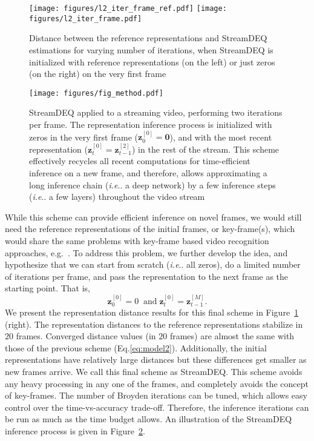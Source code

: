 \documentclass[runningheads]{llncs}
\makeatletter
\DeclareRobustCommand\onedot{\futurelet\@let@token\@onedot}
\def\@onedot{\ifx\@let@token.\else.\null\fi\xspace}
\def\ie{\emph{i.e}\onedot} \def\Ie{\emph{I.e}\onedot}
\makeatother
\begin{document}
\begin{figure}[t]
    \centering
    \texttt{[image: figures/l2\_iter\_frame\_ref.pdf]}
    \hfill
    \texttt{[image: figures/l2\_iter\_frame.pdf]} 
\caption{Distance between the reference representations and StreamDEQ estimations for varying number of iterations, when StreamDEQ is initialized with reference representations (on the left) or just zeros (on the right) on the very first frame}
\label{fig:l2_iter_frame}
\end{figure}


\begin{figure}[t]
\centering
\texttt{[image: figures/fig\_method.pdf]}
\caption{StreamDEQ applied to a streaming video, performing two iterations per frame. The representation inference process is initialized with zeros in the very first frame ($\mathbf{z}_0^{[0]}=\mathbf{0}$), and with the most recent representation ($\mathbf{z}_t^{[0]}=\mathbf{z}_{t-1}^{[2]}$) in the rest of the stream. This scheme effectively recycles all recent computations for time-efficient inference on a new frame, and therefore, allows approximating a long inference chain (\ie a deep network) by a few inference steps (\ie a few layers) throughout the video stream}
\label{fig:model_picture}
\end{figure}


While this scheme can provide efficient inference on novel frames, we would still need the reference representations of the initial frames, or key-frame(s), which would share the same problems with key-frame based video recognition approaches, e.g.~\cite{zhu2017dff,xu2018dynamic,liu2019looking}. To address this problem, we further develop the idea, and hypothesize that we can start from scratch (\ie all zeros), do a limited number of iterations per frame, and pass the representation to the next frame as the starting point. That is, 
\begin{equation}
    \mathbf{z}_0^{[0]} = 0 \;\;\mathrm{and}\; \mathbf{z}_t^{[0]} = \mathbf{z}_{t-1}^{[M]} . \label{eq:model3}
\end{equation} 
We present the representation distance results for this final scheme in Figure~\ref{fig:l2_iter_frame} (right). The representation distances to the reference representations stabilize in $20$ frames. Converged distance values (in $20$ frames) are almost the same with those of the previous scheme (Eq.\ref{eq:model2}). Additionally, the initial representations have relatively large distances but these differences get smaller as new frames arrive. We call this final scheme as StreamDEQ. This scheme avoids any heavy processing in any one of the frames, and completely avoids the concept of key-frames. The number of Broyden iterations can be tuned, which allows easy control over the time-vs-accuracy trade-off.  Therefore, the inference iterations can be run as much as the time budget allows. An illustration of the StreamDEQ inference process is given in Figure~\ref{fig:model_picture}.
\end{document}
